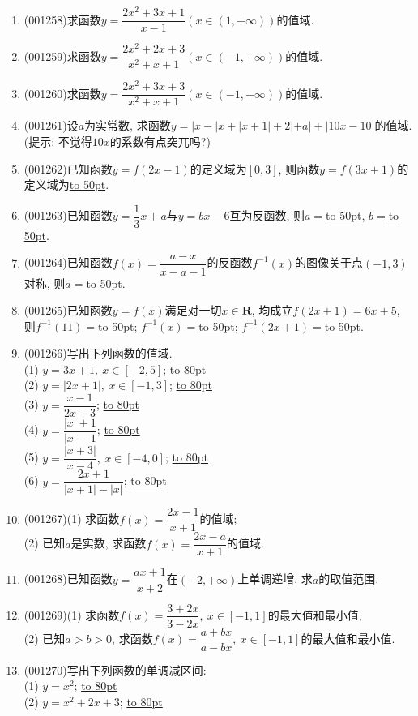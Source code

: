 \documentclass[10pt,a4paper]{article}
\newcommand{\blank}[1]{\underline{\hbox to #1pt{}}}
\begin{document}
\begin{enumerate}[1.]
\item {\tiny (001258)}求函数$y=\dfrac{2x^2+3x+1}{x-1}(x\in(1,+\infty))$的值域.
\item {\tiny (001259)}求函数$y=\dfrac{2x^2+2x+3}{x^2+x+1}(x\in(-1,+\infty))$的值域.
\item {\tiny (001260)}求函数$y=\dfrac{2x^2+3x+3}{x^2+x+1}(x\in(-1,+\infty))$的值域.
\item {\tiny (001261)}设$a$为实常数, 求函数$y=|x-|x+|x+1|+2|+a|+|10x-10|$的值域. (提示: 不觉得$10x$的系数有点突兀吗?)
\item {\tiny (001262)}已知函数$y=f(2x-1)$的定义域为$[0,3]$, 则函数$y=f(3x+1)$的定义域为\blank{50}.
\item {\tiny (001263)}已知函数$y=\dfrac{1}{3}x+a$与$y=bx-6$互为反函数, 则$a=$\blank{50}, $b=$\blank{50}.
\item {\tiny (001264)}已知函数$f(x)=\dfrac{a-x}{x-a-1}$的反函数$f^{-1}(x)$的图像关于点$(-1,3)$对称, 则$a=$\blank{50}.
\item {\tiny (001265)}已知函数$y=f(x)$满足对一切$x \in\mathbf{R}$, 均成立$f(2x+1)=6x+5$, 则$f^{-1}(11)=$\blank{50}; $f^{-1}(x)=$\blank{50}; $f^{-1}(2x+1)=$\blank{50}.
\item {\tiny (001266)}写出下列函数的值域.\\ 
(1) $y=3x+1, \ x \in [-2,5]$; \blank{80}\\ 
(2) $y=|2x+1|, \ x \in [-1,3]$; \blank{80}\\ 
(3) $y=\dfrac{x-1}{2x+3}$; \blank{80}\\ 
(4) $y=\dfrac{|x|+1}{|x|-1}$; \blank{80}\\ 
(5) $y=\dfrac{|x+3|}{x-4}, \ x \in [-4,0]$; \blank{80}\\ 
(6) $y=\dfrac{2x+1}{|x+1|-|x|}$; \blank{80}
\item {\tiny (001267)}(1) 求函数$f(x)=\dfrac{2x-1}{x+1}$的值域;\\ 
(2) 已知$a$是实数, 求函数$f(x)=\dfrac{2x-a}{x+1}$的值域.
\item {\tiny (001268)}已知函数$y=\dfrac{ax+1}{x+2}$在$(-2,+\infty)$上单调递增, 求$a$的取值范围.
\item {\tiny (001269)}(1) 求函数$f(x)=\dfrac{3+2x}{3-2x}, \ x \in [-1,1]$的最大值和最小值;\\ 
(2) 已知$a>b>0$, 求函数$f(x)=\dfrac{a+bx}{a-bx}, \ x \in [-1,1]$的最大值和最小值.
\item {\tiny (001270)}写出下列函数的单调减区间:\\ 
(1) $y=x^2$; \blank{80}\\ 
(2) $y=x^2+2x+3$; \blank{80}\\ 

\end{enumerate}
\end{document}
